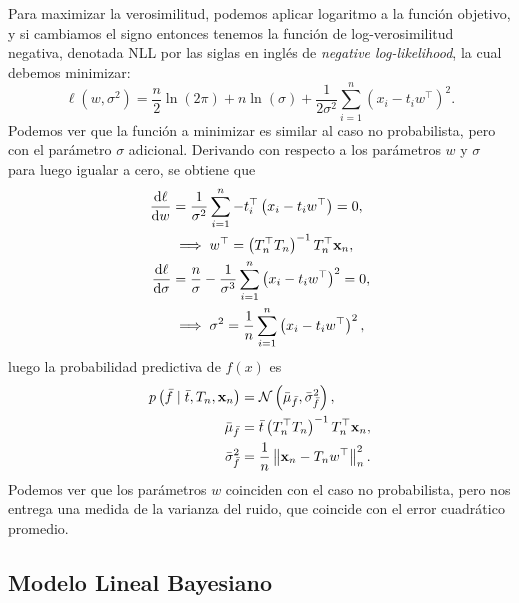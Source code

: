 Para maximizar la verosimilitud, podemos aplicar logaritmo a la función objetivo, y si cambiamos el signo entonces tenemos la función de log-verosimilitud negativa, denotada NLL por las siglas en inglés de \emph{negative log-likelihood}, la cual debemos minimizar:
\begin{equation*}
	\ell \left(w, \sigma^2\right) = \frac{n}{2} \ln(2\pi) + n \ln(\sigma) + \frac{1}{2\sigma^2} \sum_{i=1}^n \left(x_i - t_i w^{\top}\right)^2.
\end{equation*}
Podemos ver que la función a minimizar es similar al caso no probabilista, pero con el parámetro \(\sigma\) adicional. Derivando con respecto a los parámetros \(w\) y \(\sigma\) para luego igualar a cero, se obtiene que
\begin{align*}
	\dv{\ell}{w}		&= \frac{1}{\sigma^2} \sum_{i=1}^n - t_i^{\top} \left(x_i - t_i w^{\top}\right) = 0,\\
						&\implies w^{\top} = \left(T_n^{\top} T_n\right)^{-1} T_n^{\top}\mathbf{x}_n,\\
	\dv{\ell}{\sigma}	&= \frac{n}{\sigma} - \frac{1}{\sigma^3} \sum_{i=1}^n \left(x_i - t_i w^{\top}\right)^2 = 0,\\
						&\implies \sigma^2 = \frac{1}{n} \sum_{i=1}^n \left(x_i - t_i w^{\top}\right)^2,
\end{align*}
luego la probabilidad predictiva de \(f(x)\) es
\begin{align*}
	p\left(\bar{f} \mid \bar{t}, T_n, \mathbf{x}_n\right)	&= \mathcal{N} \left(\bar{\mu}_{\bar{f}}, \bar{\sigma}_{\bar{f}}^2\right),\\
	\bar{\mu}_{\bar{f}}								&= \bar{t} \left(T_n^{\top} T_n\right)^{-1} T_n^{\top} \mathbf{x}_n,\\
	\bar{\sigma}_{\bar{f}}^2						&= \frac{1}{n} \left\Vert \mathbf{x}_n - T_n w^{\top} \right\Vert_n^2.
\end{align*}
Podemos ver que los parámetros \(w\) coinciden con el caso no probabilista, pero nos entrega una medida de la varianza del ruido, que coincide con el error cuadrático promedio.

\subsection{Modelo Lineal Bayesiano}


